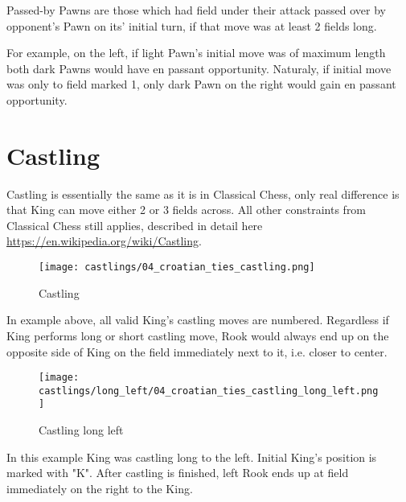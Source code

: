 Passed-by Pawns are those which had field under their attack passed over by opponent's Pawn
on its' initial turn, if that move was at least 2 fields long.

For example, on the left, if light Pawn's initial move was of maximum length both dark Pawns
would have en passant opportunity. Naturaly, if initial move was only to field marked 1, only
dark Pawn on the right would gain en passant opportunity.

\clearpage %

\section*{Castling}

Castling is essentially the same as it is in Classical Chess, only real difference is that
King can move either 2 or 3 fields across. All other constraints from Classical Chess still
applies, described in detail here \\
\href{https://en.wikipedia.org/wiki/Castling}{https://en.wikipedia.org/wiki/Castling}.

\noindent
\begin{figure}[!h]
\texttt{[image: castlings/04\_croatian\_ties\_castling.png]}
\caption{Castling}
\label{fig:cc_castling}
\end{figure}

In example above, all valid King's castling moves are numbered. Regardless if King performs
long or short castling move, Rook would always end up on the opposite side of King on the
field immediately next to it, i.e. closer to center.

\noindent
\begin{figure}[!h]
\texttt{[image: castlings/long\_left/04\_croatian\_ties\_castling\_long\_left.png]}
\caption{Castling long left}
\label{fig:cc_castling_long_left}
\end{figure}

In this example King was castling long to the left. Initial King's position is marked with "K".
After castling is finished, left Rook ends up at field immediately on the right to the King.

\clearpage %

